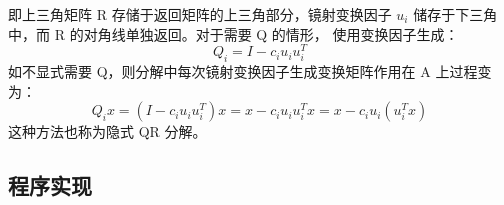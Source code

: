 即上三角矩阵 R 存储于返回矩阵的上三角部分，镜射变换因子 $u_i$ 储存于下三角中，而 R 的对角线单独返回。对于需要 Q 的情形，
使用变换因子生成：
\begin{equation*}
    Q_i=I-c_iu_i u_i^{T}
\end{equation*}
如不显式需要 Q，则分解中每次镜射变换因子生成变换矩阵作用在 A 上过程变为：
\begin{equation*}
    Q_{i}x=(I-c_iu_{i}u_{i}^{T})x=x-c_iu_{i}u_{i}^Tx=x-c_iu_{i}(u_{i}^Tx)
\end{equation*}
这种方法也称为隐式 QR 分解。

\subsection{程序实现}